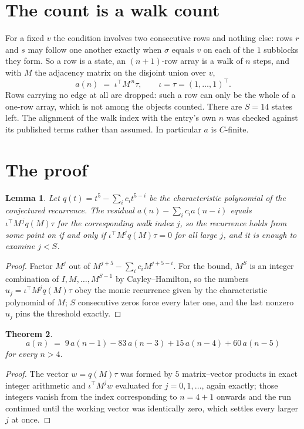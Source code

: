 \documentclass[11pt,a4paper]{article}
\theoremstyle{plain}
\newtheorem{theorem}{Theorem}
\newtheorem{lemma}[theorem]{Lemma}
\theoremstyle{definition}
\begin{document}
\section{The count is a walk count}

For a fixed $v$ the condition involves two consecutive rows and nothing
else: rows $r$ and $s$ may follow one another exactly when $\sigma$ equals $v$ on each of the
$1$ subblocks they form. So a row is a state, an $(n+1)$-row array is a walk of $n$
steps, and with $M$ the adjacency matrix on the disjoint union over $v$,
\[
a(n)\;=\;\iota^{\!\top}M^{\,n}\tau,\qquad\iota=\tau=(1,\dots,1)^{\!\top} .
\]
Rows carrying no edge at all are dropped: such a row can only be the whole of a one-row
array, which is not among the objects counted. There are $S=14$ states left.
The alignment of the walk index with the entry's own $n$ was checked against its published
terms rather than assumed. In particular $a$ is $C$-finite.

\section{The proof}

\begin{lemma}\label{lem:crit}
Let $q(t)=t^{5}-\sum_i c_it^{5-i}$ be the characteristic polynomial of the
conjectured recurrence. The residual $a(n)-\sum_ic_ia(n-i)$ equals
$\iota^{\!\top}M^{\,j}q(M)\tau$ for the corresponding walk index $j$, so the recurrence
holds from some point on if and only if $\iota^{\!\top}M^{j}q(M)\tau=0$ for all large $j$,
and it is enough to examine $j<S$.
\end{lemma}

\begin{proof}
Factor $M^{j}$ out of $M^{j+5}-\sum_ic_iM^{j+5-i}$. For the bound, $M^{S}$
is an integer combination of $I,M,\dots,M^{S-1}$ by Cayley--Hamilton, so the numbers
$u_j=\iota^{\!\top}M^{j}q(M)\tau$ obey the monic recurrence given by the characteristic
polynomial of $M$; $S$ consecutive zeros force every later one, and the last nonzero $u_j$
pins the threshold exactly.
\end{proof}

\begin{theorem}
\[
a(n)\;=\;9\,a(n-1) - 83\,a(n-3) + 15\,a(n-4) + 60\,a(n-5)
\]
for every $n>4$.
\end{theorem}

\begin{proof}
The vector $w=q(M)\tau$ was formed by $5$ matrix--vector products in exact integer
arithmetic and $\iota^{\!\top}M^{j}w$ evaluated for $j=0,1,\dots$, again exactly; those
integers vanish from the index corresponding to $n=4+1$ onwards and the run continued
until the working vector was identically zero, which settles every larger $j$ at once.
\end{proof}
\end{document}
